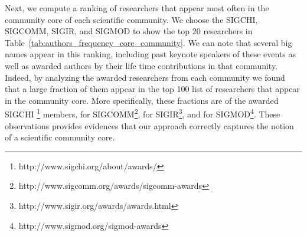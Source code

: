 Next, we compute a ranking of researchers that appear most often in the community core of each scientific community.  We choose the SIGCHI, SIGCOMM, SIGIR, and SIGMOD to show the
top 20 researchers in Table~\ref{tab:authors_frequency_core_community}.  We can note that several big names appear in this ranking, including past keynote speakers of these events
as well as awarded authors by their life time contributions in that community. Indeed, by analyzing the awarded researchers from each community we found that a large fraction of
them appear in the top 100 list of researchers that appear in the community core. More specifically, these fractions are  of the awarded SIGCHI
\footnote{http://www.sigchi.org/about/awards/} members,  for
SIGCOMM\footnote{http://www.sigcomm.org/awards/sigcomm-awards},  for SIGIR\footnote{http://www.sigir.org/awards/awards.html}, and  for
SIGMOD\footnote{http://www.sigmod.org/sigmod-awards}.  These observations provides evidences that our approach correctly captures the notion of a scientific community core. 


